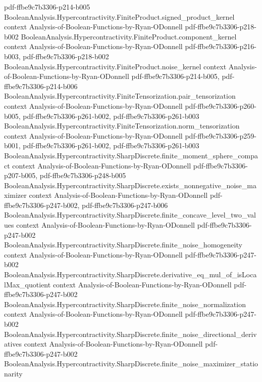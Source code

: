 \begin{theorem}
{    pdf-ffbe9c7b3306-p214-b005}
\proofstep
  {BooleanAnalysis.Hypercontractivity.FiniteProduct.signed_product_kernel}
  {context}
  {Analysis-of-Boolean-Functions-by-Ryan-ODonnell}
  {pdf-ffbe9c7b3306-p218-b002}
\proofstep
  {BooleanAnalysis.Hypercontractivity.FiniteProduct.component_kernel}
  {context}
  {Analysis-of-Boolean-Functions-by-Ryan-ODonnell}
  {pdf-ffbe9c7b3306-p216-b003,
    pdf-ffbe9c7b3306-p218-b002}
\proofstep
  {BooleanAnalysis.Hypercontractivity.FiniteProduct.noise_kernel}
  {context}
  {Analysis-of-Boolean-Functions-by-Ryan-ODonnell}
  {pdf-ffbe9c7b3306-p214-b005,
    pdf-ffbe9c7b3306-p214-b006}
\proofstep
  {BooleanAnalysis.Hypercontractivity.FiniteTensorization.pair_tensorization}
  {context}
  {Analysis-of-Boolean-Functions-by-Ryan-ODonnell}
  {pdf-ffbe9c7b3306-p260-b005,
    pdf-ffbe9c7b3306-p261-b002,
    pdf-ffbe9c7b3306-p261-b003}
\proofstep
  {BooleanAnalysis.Hypercontractivity.FiniteTensorization.norm_tensorization}
  {context}
  {Analysis-of-Boolean-Functions-by-Ryan-ODonnell}
  {pdf-ffbe9c7b3306-p259-b001,
    pdf-ffbe9c7b3306-p261-b002,
    pdf-ffbe9c7b3306-p261-b003}
\proofstep
  {BooleanAnalysis.Hypercontractivity.SharpDiscrete.finite_moment_sphere_compact}
  {context}
  {Analysis-of-Boolean-Functions-by-Ryan-ODonnell}
  {pdf-ffbe9c7b3306-p207-b005,
    pdf-ffbe9c7b3306-p248-b005}
\proofstep
  {BooleanAnalysis.Hypercontractivity.SharpDiscrete.exists_nonnegative_noise_maximizer}
  {context}
  {Analysis-of-Boolean-Functions-by-Ryan-ODonnell}
  {pdf-ffbe9c7b3306-p247-b002,
    pdf-ffbe9c7b3306-p247-b006}
\proofstep
  {BooleanAnalysis.Hypercontractivity.SharpDiscrete.finite_concave_level_two_values}
  {context}
  {Analysis-of-Boolean-Functions-by-Ryan-ODonnell}
  {pdf-ffbe9c7b3306-p247-b002}
\proofstep
  {BooleanAnalysis.Hypercontractivity.SharpDiscrete.finite_noise_homogeneity}
  {context}
  {Analysis-of-Boolean-Functions-by-Ryan-ODonnell}
  {pdf-ffbe9c7b3306-p247-b002}
\proofstep
  {BooleanAnalysis.Hypercontractivity.SharpDiscrete.derivative_eq_mul_of_isLocalMax_quotient}
  {context}
  {Analysis-of-Boolean-Functions-by-Ryan-ODonnell}
  {pdf-ffbe9c7b3306-p247-b002}
\proofstep
  {BooleanAnalysis.Hypercontractivity.SharpDiscrete.finite_noise_normalization}
  {context}
  {Analysis-of-Boolean-Functions-by-Ryan-ODonnell}
  {pdf-ffbe9c7b3306-p247-b002}
\proofstep
  {BooleanAnalysis.Hypercontractivity.SharpDiscrete.finite_noise_directional_derivatives}
  {context}
  {Analysis-of-Boolean-Functions-by-Ryan-ODonnell}
  {pdf-ffbe9c7b3306-p247-b002}
\proofstep
  {BooleanAnalysis.Hypercontractivity.SharpDiscrete.finite_noise_maximizer_stationarity}

\end{theorem}
